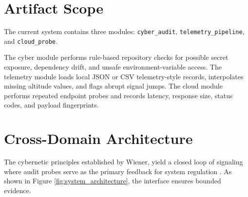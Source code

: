 \documentclass[11pt]{article}
\begin{document}
\section{Artifact Scope}

The current system contains three modules: \texttt{cyber\_audit}, \texttt{telemetry\_pipeline}, and \texttt{cloud\_probe}.

The cyber module performs rule-based repository checks for possible secret exposure, dependency drift, and unsafe environment-variable access. The telemetry module loads local JSON or CSV telemetry-style records, interpolates missing altitude values, and flags abrupt signal jumps. The cloud module performs repeated endpoint probes and records latency, response size, status codes, and payload fingerprints.

\section{Cross-Domain Architecture}

The cybernetic principles established by Wiener, yield a closed loop of signaling where audit probes serve as the primary feedback for system regulation \cite{wiener}. As shown in Figure \ref{fig:system_architecture}, the interface ensures bounded evidence. 
\end{document}
